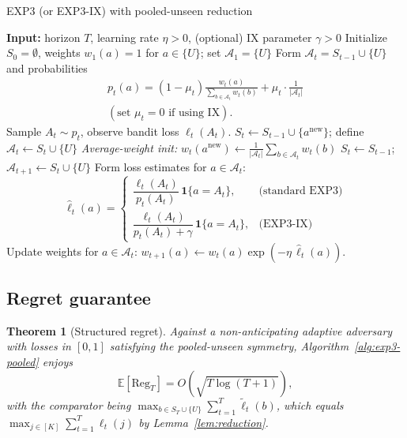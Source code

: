 \documentclass[10pt,twocolumn]{article}
\newcommand{\E}{\mathbb{E}}
\newcommand{\Reg}{\mathrm{Reg}}
\newtheorem{theorem}{Theorem}
\theoremstyle{definition}
\theoremstyle{remark}
\begin{document}
\begin{algorithm}[h]
  \caption{EXP3 (or EXP3-IX) with pooled-unseen reduction}
  \label{alg:exp3-pooled}
  \begin{algorithmic}[1]
    \State \textbf{Input:} horizon $T$, learning rate $\eta>0$, (optional) IX parameter $\gamma>0$
    \State Initialize $S_0=\emptyset$, weights $w_1(a)=1$ for $a\in\{U\}$; set $\mathcal{A}_1=\{U\}$
    \State Form $\mathcal{A}_t=S_{t-1}\cup\{U\}$ and probabilities
    \begin{align*}
      p_t(a)= (1-\mu_t)\frac{w_t(a)}{\sum_{b\in\mathcal{A}_t} w_t(b)} + \mu_t\cdot \frac{1}{|\mathcal{A}_t|} \\
      (\text{set }\mu_t=0\text{ if using IX}).
    \end{align*}
    \State Sample $A_t\sim p_t$, observe bandit loss $\ell_t(A_t)$.
     
    \State $S_t\gets S_{t-1}\cup\{a^{\text{new}}\}$; define $\mathcal{A}_t\gets S_t\cup\{U\}$
    \State \textit{Average-weight init:} $w_t(a^{\text{new}})\gets \frac{1}{|\mathcal{A}_t|}\sum_{b\in\mathcal{A}_t} w_t(b)$
    \Else
    \State $S_t\gets S_{t-1}$; $\mathcal{A}_{t+1}\gets S_t\cup\{U\}$
    \EndIf
    \State Form loss estimates for $a\in\mathcal{A}_t$:
    \[
      \widehat{\ell}_t(a)=
      \begin{cases}
        \dfrac{\ell_t(A_t)}{p_t(A_t)}\,\mathbf{1}\{a=A_t\},        & \text{(standard EXP3)}                 \\[6pt]
        \dfrac{\ell_t(A_t)}{p_t(A_t)+\gamma}\,\mathbf{1}\{a=A_t\}, & \text{(EXP3-IX)}
      \end{cases}
    \]
    \State Update weights for $a\in\mathcal{A}_t$: \quad $w_{t+1}(a)\gets w_t(a)\exp(-\eta\,\widehat{\ell}_t(a))$.
    \EndFor
  \end{algorithmic}
\end{algorithm}

\subsection{Regret guarantee}
\begin{theorem}[Structured regret]
  \label{thm:structured-regret}
  Against a non-anticipating adaptive adversary with losses in $[0,1]$ satisfying the pooled-unseen symmetry, Algorithm~\ref{alg:exp3-pooled} enjoys
  \[
    \E[\Reg_T]=O\!\left(\sqrt{T\log(T{+}1)}\right),
  \]
  with the comparator being $\max_{b\in S_T\cup\{U\}}\sum_{t=1}^T \tilde\ell_t(b)$, which equals $\max_{j\in[K]}\sum_{t=1}^T \ell_t(j)$ by Lemma~\ref{lem:reduction}.
\end{theorem}
\end{document}

